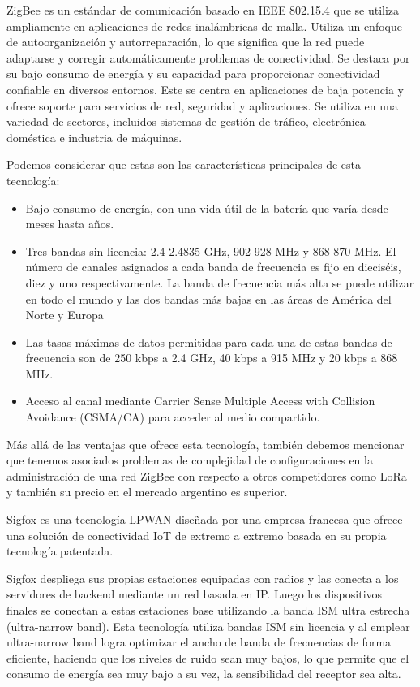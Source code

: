 ZigBee es un estándar de comunicación basado en IEEE 802.15.4 que se utiliza ampliamente en aplicaciones de redes inalámbricas de malla. Utiliza un enfoque de autoorganización y autorreparación, lo que significa que la red puede adaptarse y corregir automáticamente problemas de conectividad. Se destaca por su bajo consumo de energía y su capacidad para proporcionar conectividad confiable en diversos entornos. Este se centra en aplicaciones de baja potencia y ofrece soporte para servicios de red, seguridad y aplicaciones. Se utiliza en una variedad de sectores, incluidos sistemas de gestión de tráfico, electrónica doméstica e industria de máquinas.

Podemos considerar que estas son las características principales de esta tecnología:
\begin{itemize}
    \item Bajo consumo de energía, con una vida útil de la batería que varía desde meses hasta años.
    \item Tres bandas sin licencia: 2.4-2.4835 GHz, 902-928 MHz y 868-870 MHz. El número de canales asignados a cada banda de frecuencia es fijo en dieciséis, diez y uno respectivamente. La banda de frecuencia más alta se puede utilizar en todo el mundo y las dos bandas más bajas en las áreas de América del Norte y Europa
    \item Las tasas máximas de datos permitidas para cada una de estas bandas de frecuencia son de 250 kbps a 2.4 GHz, 40 kbps a 915 MHz y 20 kbps a 868 MHz.
    \item Acceso al canal mediante Carrier Sense Multiple Access with Collision Avoidance (CSMA/CA) para acceder al medio compartido.
\end{itemize}

Más allá de las ventajas que ofrece esta tecnología, también debemos mencionar que tenemos asociados problemas de complejidad de configuraciones en la administración de una red ZigBee con respecto a otros competidores como LoRa y también su precio en el mercado argentino es superior.

Sigfox es una tecnología LPWAN diseñada por una empresa francesa que ofrece una solución de conectividad IoT de extremo a extremo basada en su propia tecnología patentada.

Sigfox despliega sus propias estaciones equipadas con radios y las conecta a los servidores de backend mediante un red basada en IP. Luego los dispositivos finales se conectan a estas estaciones base utilizando la banda ISM ultra estrecha (ultra-narrow band). Esta tecnología utiliza bandas ISM sin licencia y al emplear ultra-narrow band logra optimizar el ancho de banda de frecuencias de forma eficiente, haciendo que los niveles de ruido sean muy bajos, lo que permite que el consumo de energía sea muy bajo a su vez, la sensibilidad del receptor sea alta.

